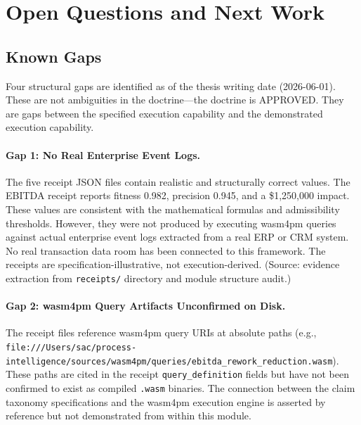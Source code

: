 
\section{Open Questions and Next Work}
\label{sec:ma-open-questions}

\subsection{Known Gaps}
\label{sec:ma-gaps-known}

Four structural gaps are identified as of the thesis writing date (2026-06-01). These are not
ambiguities in the doctrine---the doctrine is APPROVED. They are gaps between the specified
execution capability and the demonstrated execution capability.

\paragraph{Gap 1: No Real Enterprise Event Logs.}
The five receipt JSON files contain realistic and structurally correct values. The EBITDA
receipt reports fitness 0.982, precision 0.945, and a \$1,250,000 impact. These values are
consistent with the mathematical formulas and admissibility thresholds. However, they were not
produced by executing wasm4pm queries against actual enterprise event logs extracted from a
real ERP or CRM system. No real transaction data room has been connected to this framework.
The receipts are specification-illustrative, not execution-derived. (Source: evidence
extraction from \texttt{receipts/} directory and module structure audit.)

\paragraph{Gap 2: wasm4pm Query Artifacts Unconfirmed on Disk.}
The receipt files reference wasm4pm query URIs at absolute paths (e.g.,
\texttt{file:///Users/sac/process-intelligence/sources/wasm4pm/queries/ebitda\_rework\_reduction.wasm}).
These paths are cited in the receipt \texttt{query\_definition} fields but have not been
confirmed to exist as compiled \texttt{.wasm} binaries. The connection between the claim
taxonomy specifications and the wasm4pm execution engine is asserted by reference but not
demonstrated from within this module.

